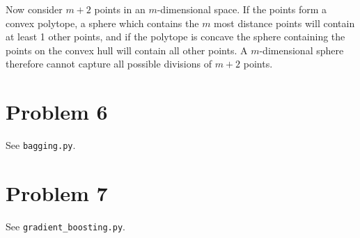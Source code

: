 \documentclass[12pt]{article}
\begin{document}
Now consider $m+2$ points in an $m$-dimensional space. If the points form a convex polytope, a sphere which contains the $m$ most distance points will contain at least 1 other points, and if the polytope is concave the sphere containing the points on the convex hull will contain all other points. A $m$-dimensional sphere therefore cannot capture all possible divisions of $m+2$ points.

\section*{Problem 6}
See \texttt{bagging.py}.

\section*{Problem 7}
See \texttt{gradient\_boosting.py}.
\end{document}
